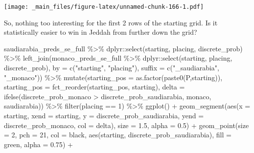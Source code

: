 \documentclass[
]{book}
\newenvironment{Shaded}{\begin{snugshade}}{\end{snugshade}}
\newcommand{\AttributeTok}[1]{\textcolor[rgb]{0.77,0.63,0.00}{#1}}
\newcommand{\DecValTok}[1]{\textcolor[rgb]{0.00,0.00,0.81}{#1}}
\newcommand{\FloatTok}[1]{\textcolor[rgb]{0.00,0.00,0.81}{#1}}
\newcommand{\FunctionTok}[1]{\textcolor[rgb]{0.00,0.00,0.00}{#1}}
\newcommand{\NormalTok}[1]{#1}
\newcommand{\SpecialCharTok}[1]{\textcolor[rgb]{0.00,0.00,0.00}{#1}}
\newcommand{\StringTok}[1]{\textcolor[rgb]{0.31,0.60,0.02}{#1}}
\begin{document}
\texttt{[image: \_main\_files/figure-latex/unnamed-chunk-166-1.pdf]}

So, nothing too interesting for the first 2 rows of the starting grid. Is it statistically easier to win in Jeddah from further down the grid?

\begin{Shaded}
\begin{Highlighting}[]
\NormalTok{saudiarabia\_preds\_se\_full }\SpecialCharTok{\%\textgreater{}\%}
\NormalTok{  dplyr}\SpecialCharTok{::}\FunctionTok{select}\NormalTok{(starting, placing, discrete\_prob) }\SpecialCharTok{\%\textgreater{}\%}
  \FunctionTok{left\_join}\NormalTok{(monaco\_preds\_se\_full }\SpecialCharTok{\%\textgreater{}\%}
\NormalTok{  dplyr}\SpecialCharTok{::}\FunctionTok{select}\NormalTok{(starting, placing, discrete\_prob), }\AttributeTok{by =} \FunctionTok{c}\NormalTok{(}\StringTok{"starting"}\NormalTok{, }\StringTok{"placing"}\NormalTok{), }\AttributeTok{suffix =} \FunctionTok{c}\NormalTok{(}\StringTok{"\_saudiarabia"}\NormalTok{, }\StringTok{"\_monaco"}\NormalTok{)) }\SpecialCharTok{\%\textgreater{}\%}
  \FunctionTok{mutate}\NormalTok{(}\AttributeTok{starting\_pos =} \FunctionTok{as.factor}\NormalTok{(}\FunctionTok{paste0}\NormalTok{(}\StringTok{\textquotesingle{}P\textquotesingle{}}\NormalTok{,starting)),}
         \AttributeTok{starting\_pos =} \FunctionTok{fct\_reorder}\NormalTok{(starting\_pos, starting),}
         \AttributeTok{delta =} \FunctionTok{ifelse}\NormalTok{(discrete\_prob\_monaco }\SpecialCharTok{\textgreater{}}\NormalTok{ discrete\_prob\_saudiarabia, }\StringTok{\textquotesingle{}monaco\textquotesingle{}}\NormalTok{, }\StringTok{\textquotesingle{}saudiarabia\textquotesingle{}}\NormalTok{)) }\SpecialCharTok{\%\textgreater{}\%}
  \FunctionTok{filter}\NormalTok{(placing }\SpecialCharTok{==} \DecValTok{1}\NormalTok{) }\SpecialCharTok{\%\textgreater{}\%}
  \FunctionTok{ggplot}\NormalTok{() }\SpecialCharTok{+}
  \FunctionTok{geom\_segment}\NormalTok{(}\FunctionTok{aes}\NormalTok{(}\AttributeTok{x =}\NormalTok{ starting, }\AttributeTok{xend =}\NormalTok{ starting, }\AttributeTok{y =}\NormalTok{ discrete\_prob\_saudiarabia, }\AttributeTok{yend =}\NormalTok{ discrete\_prob\_monaco, }\AttributeTok{col =}\NormalTok{ delta),}
               \AttributeTok{size =} \FloatTok{1.5}\NormalTok{, }\AttributeTok{alpha =} \FloatTok{0.5}\NormalTok{) }\SpecialCharTok{+}
  \FunctionTok{geom\_point}\NormalTok{(}\AttributeTok{size =} \DecValTok{2}\NormalTok{, }\AttributeTok{pch =} \DecValTok{21}\NormalTok{, }\AttributeTok{col =} \StringTok{\textquotesingle{}black\textquotesingle{}}\NormalTok{, }\FunctionTok{aes}\NormalTok{(starting, discrete\_prob\_saudiarabia), }\AttributeTok{fill =} \StringTok{\textquotesingle{}green\textquotesingle{}}\NormalTok{, }\AttributeTok{alpha =} \FloatTok{0.75}\NormalTok{) }\SpecialCharTok{+}

\end{Highlighting}
\end{Shaded}
\end{document}
